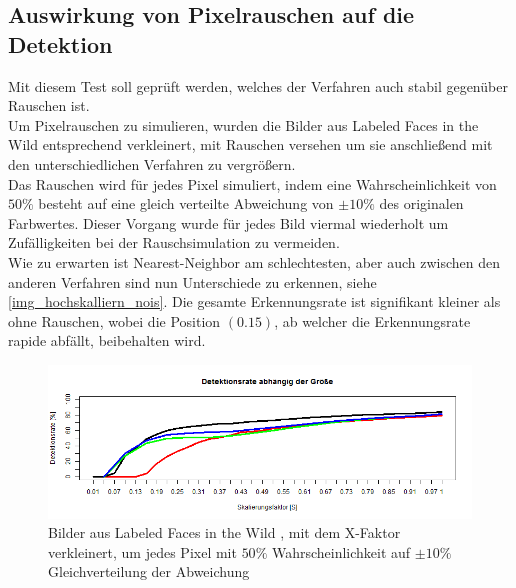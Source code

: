 \subsection{Auswirkung von Pixelrauschen auf die Detektion}
Mit diesem Test soll geprüft werden, welches der Verfahren auch stabil gegenüber Rauschen ist.\\
Um Pixelrauschen zu simulieren, wurden die Bilder aus Labeled Faces in the Wild \cite{database_Face} entsprechend verkleinert, mit Rauschen versehen um sie anschließend mit den unterschiedlichen Verfahren zu vergrößern.\\
Das Rauschen wird für jedes Pixel simuliert, indem eine Wahrscheinlichkeit von $50\%$ besteht auf eine gleich verteilte Abweichung von $\pm 10\%$ des originalen Farbwertes. Dieser Vorgang wurde für jedes Bild viermal wiederholt um Zufälligkeiten bei der Rauschsimulation zu vermeiden.\\
Wie zu erwarten ist Nearest-Neighbor am schlechtesten, aber auch zwischen den anderen Verfahren sind nun Unterschiede zu erkennen, siehe \autoref{img_hochskalliern_nois}. Die gesamte Erkennungsrate ist signifikant kleiner als ohne Rauschen, wobei die Position $(0.15)$, ab welcher die Erkennungsrate rapide abfällt, beibehalten wird.
\begin{figure}
	\centering
	\includegraphics[width=\linewidth]{img_Skalierung/Hochskalliern_Nois}
	\caption{Bilder aus Labeled Faces in the Wild \cite{database_Face}, mit dem X-Faktor verkleinert, um jedes Pixel mit $50\%$ Wahrscheinlichkeit auf $\pm 10\%$ Gleichverteilung der Abweichung}
	\label{img_hochskalliern_nois}
\end{figure}
